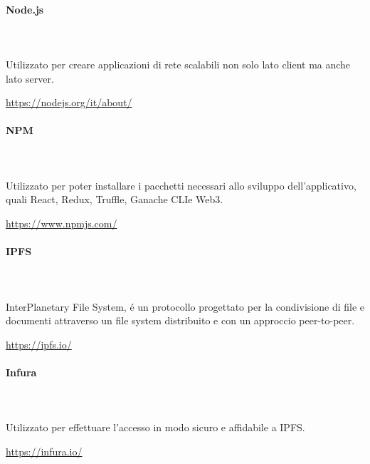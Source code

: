 		\paragraph{Node.js} \mbox{}\\ \mbox{}\\
		Utilizzato per creare applicazioni di rete scalabili non solo lato client ma anche lato server.\\
		\centerline{\url{https://nodejs.org/it/about/}}
		
		\paragraph{NPM} \mbox{}\\ \mbox{}\\
		Utilizzato per poter installare i pacchetti necessari allo sviluppo dell'applicativo, quali React\glo, Redux\glo, Truffle\glo, Ganache CLI\glosp e Web3\glo. \\
		\centerline{\url{https://www.npmjs.com/}}
		
		\paragraph{IPFS} \mbox{}\\ \mbox{}\\
		InterPlanetary File System, \'e un protocollo progettato per la condivisione di file e documenti attraverso un file system 
		distribuito e con un approccio peer-to-peer. \\
		\centerline{\url{https://ipfs.io/}}
		
		\paragraph{Infura} \mbox{}\\ \mbox{}\\
		Utilizzato per effettuare l'accesso in modo sicuro e affidabile a IPFS\glo. \\
		\centerline{\url{https://infura.io/}}
		
